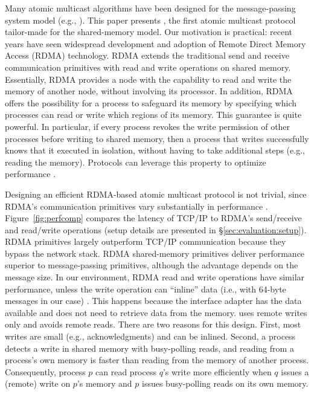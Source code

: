Many atomic multicast algorithms have been designed for the message-passing system model (e.g., \cite{Coelho2017,gotsman2019white,birman1987reliable, delporte2000fault, bezerra2015ridge,
marandi2012multi}).
This paper presents \libname, the first atomic multicast protocol tailor-made for the shared-memory model.
Our motivation is practical: recent years have seen widespread development and adoption of Remote Direct Memory Access (RDMA) technology.
RDMA extends the traditional send and receive communication primitives with read and write operations on shared memory.
Essentially, RDMA provides a node with the capability to read and write the memory of another node, without involving its processor.
In addition, RDMA offers the possibility for a process to safeguard its memory by specifying which processes can read or write which regions of its memory.
This guarantee is quite powerful.
In particular, if every process revokes the write permission of other processes before writing to shared memory, then a process that writes successfully knows that it executed in isolation, without having to take additional steps (e.g., reading the memory). 
Protocols can leverage this property to optimize performance \cite{Aguilera2019}.

Designing an efficient RDMA-based atomic multicast protocol is not trivial, since RDMA's communication primitives vary substantially in performance \cite{kalia2014using,mitchell2013using}.
Figure~\ref{fig:perfcomp} compares the latency of TCP/IP to RDMA's send/receive and read/write operations (setup details are presented in \S\ref{sec:evaluation:setup}).
RDMA primitives largely outperform TCP/IP communication because they bypass the network stack.
RDMA shared-memory primitives deliver performance superior to message-passing primitives, although the advantage depends on the message size.
In our environment, RDMA read and write operations have similar performance, unless the write operation can ``inline'' data (i.e., with 64-byte messages in our case) \cite{mitchell2013using}.
This happens because the interface adapter has the data available and does not need to retrieve data from the memory.
\libname uses remote writes only and avoids remote reads.
There are two reasons for this design.
First, most writes are small (e.g., acknowledgments) and can be inlined.
Second, a process detects a write in shared memory with busy-polling reads, and reading from a process's own memory is faster than reading from the memory of another process.
Consequently, process $p$ can read process $q$'s write more efficiently when $q$ issues a (remote) write on $p$'s memory and $p$ issues busy-polling reads on its own memory.  

